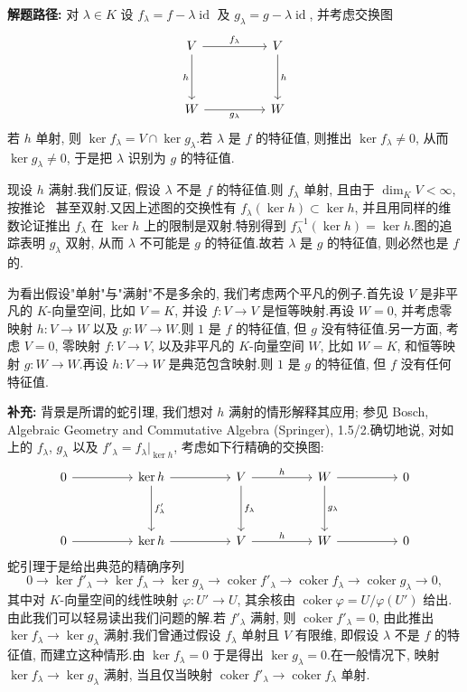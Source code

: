\noindent\textbf{解题路径:} 对 $\lambda \in K$ 设 $f_\lambda = f - \lambda \operatorname{id}$ 及 $g_\lambda = g - \lambda \operatorname{id}$, 并考虑交换图
\[
\begin{tikzcd}[row sep=huge, column sep=huge]
V \arrow[r, "f_\lambda"] \arrow[d, "h"'] & V \arrow[d, "h"] \\
W \arrow[r, "g_\lambda"'] & W
\end{tikzcd}
\]
若 $h$ 单射, 则 $\ker f_\lambda = V \cap \ker g_\lambda$.若 $\lambda$ 是 $f$ 的特征值, 则推出 $\ker f_\lambda \neq 0$, 从而 $\ker g_\lambda \neq 0$, 于是把 $\lambda$ 识别为 $g$ 的特征值.

现设 $h$ 满射.我们反证, 假设 $\lambda$ 不是 $f$ 的特征值.则 $f_\lambda$ 单射, 且由于 $\dim_K V < \infty$, 按推论~ 甚至双射.又因上述图的交换性有 $f_\lambda(\ker h) \subset \ker h$, 并且用同样的维数论证推出 $f_\lambda$ 在 $\ker h$ 上的限制是双射.特别得到 $f_\lambda^{-1}(\ker h) = \ker h$.图的追踪表明 $g_\lambda$ 双射, 从而 $\lambda$ 不可能是 $g$ 的特征值.故若 $\lambda$ 是 $g$ 的特征值, 则必然也是 $f$ 的.

为看出假设"单射"与"满射"不是多余的, 我们考虑两个平凡的例子.首先设 $V$ 是非平凡的 $K$-向量空间, 比如 $V = K$, 并设 $f \colon V \longrightarrow V$ 是恒等映射.再设 $W = 0$, 并考虑零映射 $h \colon V \longrightarrow W$ 以及 $g \colon W \longrightarrow W$.则 $1$ 是 $f$ 的特征值, 但 $g$ 没有特征值.另一方面, 考虑 $V = 0$, 零映射 $f \colon V \longrightarrow V$, 以及非平凡的 $K$-向量空间 $W$, 比如 $W = K$, 和恒等映射 $g \colon W \longrightarrow W$.再设 $h \colon V \longrightarrow W$ 是典范包含映射.则 $1$ 是 $g$ 的特征值, 但 $f$ 没有任何特征值.

\noindent\textbf{补充:} 背景是所谓的蛇引理, 我们想对 $h$ 满射的情形解释其应用; 参见 Bosch, Algebraic Geometry and Commutative Algebra (Springer), 1.5/2.确切地说, 对如上的 $f_\lambda$, $g_\lambda$ 以及 $f'_\lambda = f_\lambda|_{\ker h}$, 考虑如下行精确的交换图:
\[
\begin{tikzcd}[row sep=huge, column sep=huge]
0 \arrow[r] & \ker h \arrow[r] \arrow[d, "f'_\lambda"] & V \arrow[r, "h"] \arrow[d, "f_\lambda"] & W \arrow[r] \arrow[d, "g_\lambda"] & 0 \\
0 \arrow[r] & \ker h \arrow[r] & V \arrow[r, "h"] & W \arrow[r] & 0
\end{tikzcd}
\]
蛇引理于是给出典范的精确序列
\[
0 \longrightarrow \ker f'_\lambda \longrightarrow \ker f_\lambda \longrightarrow \ker g_\lambda \longrightarrow \operatorname{coker} f'_\lambda \longrightarrow \operatorname{coker} f_\lambda \longrightarrow \operatorname{coker} g_\lambda \longrightarrow 0,
\]
其中对 $K$-向量空间的线性映射 $\varphi \colon U' \longrightarrow U$, 其余核由
$\operatorname{coker} \varphi = U/\varphi(U')$ 给出.由此我们可以轻易读出我们问题的解.若 $f'_\lambda$ 满射, 则 $\operatorname{coker} f'_\lambda = 0$, 由此推出 $\ker f_\lambda \longrightarrow \ker g_\lambda$ 满射.我们曾通过假设 $f_\lambda$ 单射且 $V$ 有限维, 即假设 $\lambda$ 不是 $f$ 的特征值, 而建立这种情形.由 $\ker f_\lambda = 0$ 于是得出 $\ker g_\lambda = 0$.在一般情况下, 映射 $\ker f_\lambda \longrightarrow \ker g_\lambda$ 满射, 当且仅当映射 $\operatorname{coker} f'_\lambda \longrightarrow \operatorname{coker} f_\lambda$ 单射.

